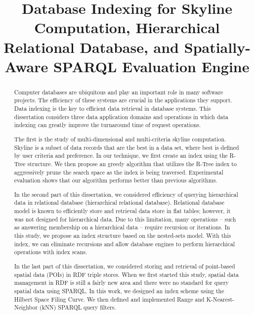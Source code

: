 \documentclass[12pt]{report}
\title{Database Indexing for Skyline Computation, Hierarchical Relational Database, and Spatially-Aware SPARQL Evaluation Engine}
\begin{document}
\begin{romanpages}      %

\TitlePage 

\begin{abstract}
Computer databases are ubiquitous and play an important role in many software projects. The efficiency of these systems are crucial in the applications they support. Data indexing is the key to efficient data retrieval in database systems. This dissertation considers three data application domains and operations in which data indexing can greatly improve the turnaround time of request operations.

The first is the study of multi-dimensional and multi-criteria skyline computation. Skyline is a subset of data records that are the best in a data set, where best is defined by user criteria and preference. In our technique, we first create an index using the R-Tree structure. We then propose an greedy algorithm that utilizes the R-Tree index to aggressively prune the search space as the index is being traversed. Experimental evaluation shows that our algorithm performs better than previous algorithms.

In the second part of this dissertation, we considered efficiency of querying hierarchical data in relational database (hierarchical relational database). Relational database model is known to efficiently store and retrieval data store in flat tables; however, it was not designed for hierarchical data. Due to this limitation, many operations -- such as answering membership on a hierarchical data -- require recursion or iterations. In this study, we propose an index structure based on the nested-sets model. With this index, we can eliminate recursions and allow database engines to perform hierarchical operations with index scans.

In the last part of this dissertation, we considered storing and retrieval of point-based spatial data (POIs) in RDF triple stores. When we first started this study, spatial data management in RDF is still a fairly new area and there were no standard for query spatial data using SPARQL. In this work, we designed an index scheme using the Hilbert Space Filing Curve. We then defined and implemented Range and K-Nearest-Neighbor (kNN) SPARQL query filters.
\end{abstract}


\tableofcontents
\listoffigures
\listoftables
\end{romanpages}        %
\end{document}
